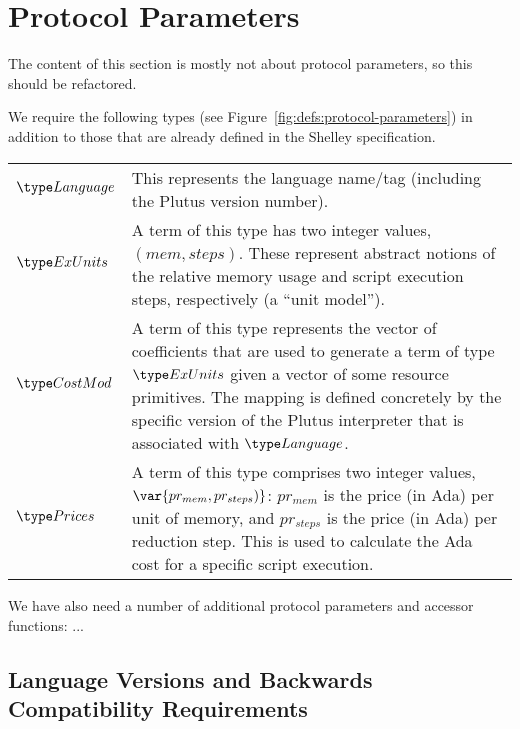 \section{Protocol Parameters}
\label{sec:protocol-parameters}

\begin{note}
  The content of this section is mostly not about protocol parameters, so this should be refactored.
\end{note}

We require the following types (see Figure~\ref{fig:defs:protocol-parameters})
in addition to those that are already defined in the Shelley specification.

\vspace{12pt}
\begin{tabular}{lp{5in}}
  $\Language$ &
  This represents the language name/tag (including the Plutus
  version number).
  \\
  $\ExUnits$ &
  A term of this type has two integer values,
  $(mem, steps)$.
  These represent abstract notions of the relative memory usage and script execution steps,
  respectively (a ``unit model'').
  \\
  $\CostMod$ &
  A term of this type represents the vector of coefficients that are used to generate
  a term of type $\ExUnits$ given a vector of some resource primitives.  The mapping is defined
  concretely by the specific version of the Plutus interpreter that is associated with $\Language$.
  \\
  $\Prices$ &
  A term of this type comprises two integer values,
  $\var{pr_{mem}, pr_{steps})}$:
  $pr_{mem}$ is the price (in Ada) per unit of memory, and $pr_{steps}$ is the price (in Ada) per
  reduction step. This is used to calculate the Ada cost for a specific script execution.
\end{tabular}
\vspace{12pt}

We have also need a number of additional protocol parameters and accessor functions: ...

\subsection{Language Versions and Backwards Compatibility Requirements}
\label{sec:versions}

